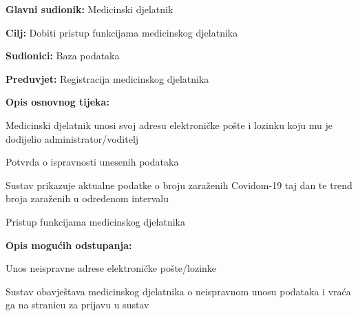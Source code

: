 				
				\noindent {}
				\begin{packed_item}
					
					\item \textbf{Glavni sudionik: }Medicinski djelatnik
					\item  \textbf{Cilj:} Dobiti pristup funkcijama medicinskog djelatnika
					\item  \textbf{Sudionici:} Baza podataka
					\item  \textbf{Preduvjet:} Registracija medicinskog djelatnika
					\item  \textbf{Opis osnovnog tijeka:}
					
					
					\item[] \begin{packed_enum}
						
						\item Medicinski djelatnik unosi svoj adresu elektroničke pošte i lozinku koju mu je dodijelio administrator/voditelj
						\item Potvrda o ispravnosti unesenih podataka
						\item Sustav prikazuje aktualne podatke o broju zaraženih Covidom-19 taj dan te trend broja zaraženih u određenom intervalu
						\item Pristup funkcijama medicinskog djelatnika
						
					\end{packed_enum}
					
					\item  \textbf{Opis mogućih odstupanja:}
					\item[2.a] Unos neispravne adrese elektroničke pošte/lozinke
					\item[] \begin{packed_enum}
						
						\item Sustav obavještava medicinskog djelatnika o neispravnom unosu podataka i vraća ga na stranicu za prijavu u sustav
						
						
						
					\end{packed_enum}
				\end{packed_item}
			
